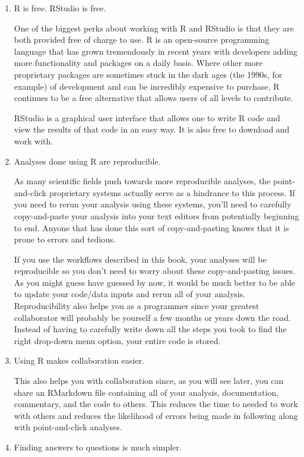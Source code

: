 \documentclass[]{tufte-book}
\begin{document}
\begin{enumerate}
\def\labelenumi{\arabic{enumi}.}
\item
  R is free. RStudio is free.

  One of the biggest perks about working with R and RStudio is that they
  are both provided free of charge to use. R is an open-source
  programming language that has grown tremendously in recent years with
  developers adding more functionality and packages on a daily basis.
  Where other more proprietary packages are sometimes stuck in the dark
  ages (the 1990s, for example) of development and can be incredibly
  expensive to purchase, R continues to be a free alternative that
  allows users of all levels to contribute.

  RStudio is a graphical user interface that allows one to write R code
  and view the results of that code in an easy way. It is also free to
  download and work with.
\item
  Analyses done using R are reproducible.

  As many scientific fields push towards more reproducible analyses, the
  point-and-click proprietary systems actually serve as a hindrance to
  this process. If you need to rerun your analysis using these systems,
  you'll need to carefully copy-and-paste your analysis into your text
  editors from potentially beginning to end. Anyone that has done this
  sort of copy-and-pasting knows that it is prone to errors and tedious.

  If you use the workflows described in this book, your analyses will be
  reproducible so you don't need to worry about these copy-and-pasting
  issues. As you might guess have guessed by now, it would be much
  better to be able to update your code/data inputs and rerun all of
  your analysis. Reproducibility also helps you as a programmer since
  your greatest collaborator will probably be yourself a few months or
  years down the road. Instead of having to carefully write down all the
  steps you took to find the right drop-down menu option, your entire
  code is stored.
\item
  Using R makes collaboration easier.

  This also helps you with collaboration since, as you will see later,
  you can share an RMarkdown file containing all of your analysis,
  documentation, commentary, and the code to others. This reduces the
  time to needed to work with others and reduces the likelihood of
  errors being made in following along with point-and-click analyses.
\item
  Finding answers to questions is much simpler.


\end{enumerate}
\end{document}
